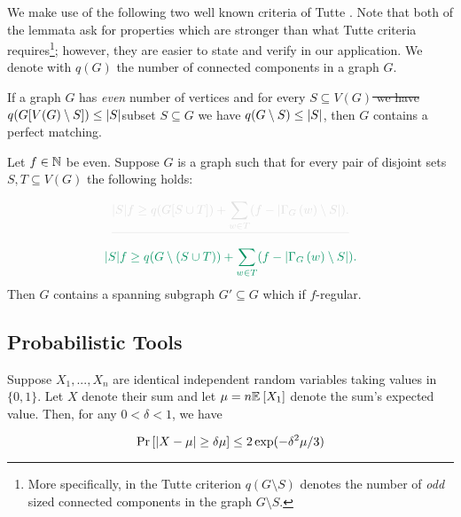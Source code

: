 \documentclass[11pt]{article}
\providecommand{\DIFadd}[1]{\textcolor{shin-ryoku}{#1}}%
\providecommand{\DIFdel}[1]{\textcolor{verylightgray}{\sout{#1}}}                      %
\providecommand{\DIFaddbegin}{} %
\providecommand{\DIFaddend}{} %
\providecommand{\DIFdelbegin}{} %
\providecommand{\DIFdelend}{} %
\begin{document}
We make use of the following two well known criteria of Tutte \cite{tutte1952factors, tutte1947factorization}. 
Note that both of the lemmata ask for properties which are stronger than what Tutte criteria requires\DIFaddbegin \footnote{\DIFadd{More specifically, in the Tutte criterion $q(G \setminus S)$ denotes the number of }\emph{\DIFadd{odd}} \DIFadd{sized connected components in the graph $G \setminus S$.}}\DIFaddend ; however, they are easier to state and verify in our application. We denote with $q(G)$ the number of connected components in a graph $G$.

\begin{lemma}\label{lemma:tutte-criterion}
If a graph $G$ has  \emph{even} number of vertices and for every \DIFdelbegin \DIFdel{$S \subseteq V(G)$ we have $q(G[V(G) \setminus S]) \leq |S|$}\DIFdelend \DIFaddbegin \DIFadd{subset $S \subseteq G$ we have $q(G \setminus S) \leq |S|$}\DIFaddend , then $G$ contains a perfect matching.
\end{lemma}

\begin{lemma}
  Let $f \in \mathbb{N}$ be even. Suppose $G$ is a graph such that for every pair of disjoint sets $S, T \subseteq V(G)$ the following holds:

  \DIFdelbegin \[ \DIFdel{|S|f \geq \OddComponents{G[S \cup T]} + \sum_{w \in T} (f - \Size{\Neighbourhood{G}{w} \setminus S}). }\]%
\DIFdelend \DIFaddbegin \[ \DIFadd{|S|f \geq \OddComponents{G \setminus (S \cup T)} + \sum_{w \in T} (f - \Size{\Neighbourhood{G}{w} \setminus S}). }\]\DIFaddend 
  Then $G$ contains a spanning subgraph $G' \subseteq G$ which if $f$-regular.
\end{lemma}



\subsection{Probabilistic Tools}

\begin{lemma}\label{lemma:mult-chernoff}
Suppose $X_1, ..., X_n$ are identical independent random variables taking values in $\{0, 1\}$. Let $X$ denote their sum and let $\mu = n\mathbb{E}_{}\left[X_1\right]$ denote the sum's expected value. Then, for any $0 < \delta < 1$, we have

\[ \Pr\left[|X - \mu| \geq \delta \mu \right] \leq 2\exp(-\delta^2\mu/3)\]

\end{lemma}
\end{document}
